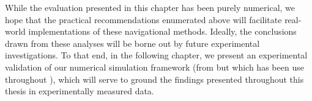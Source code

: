 While the evaluation presented in this chapter has been purely numerical, we hope that the practical recommendations enumerated above will facilitate real-world implementations of these navigational methods.
Ideally, the conclusions drawn from these analyses will be borne out by future experimental investigations.
To that end, in the following chapter, we present an experimental validation of our numerical simulation framework (from  but which has been use throughout ), which will serve to ground the findings presented throughout this thesis in experimentally measured data.